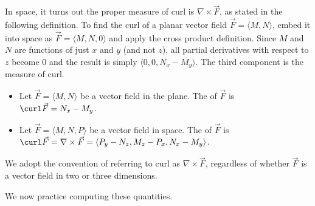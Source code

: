 In space, it turns out the proper measure of curl is $\nabla \times \vec F$, as stated in the following definition. To find the curl of a planar vector field $\vec F = \langle M,N\rangle$, embed it into space as $\vec F = \langle M, N, 0\rangle$ and apply the cross product definition. Since $M$ and $N$ are functions of just $x$ and $y$ (and not $z$), all partial derivatives with respect to $z$ become 0 and the result is simply $\langle 0,0,N_x-M_y\rangle$. The third component is the measure of curl. 

{\begin{itemize}
	\item Let $\vec F = \langle M,N\rangle$ be a vector field in the plane. The  of $\vec F$ is $\curl \vec F = N_x - M_y$.
	\item Let $\vec F = \langle M,N,P\rangle$ be a vector field in space. The  of $\vec F$ is $\curl \vec F = \nabla \times \vec F = \langle P_y-N_z,M_z-P_x,N_x - M_y\rangle$.
\end{itemize}
}

We adopt the convention of referring to curl as $\nabla \times \vec F$, regardless of whether $\vec F$ is a vector field in two or three dimensions. 

We now practice computing these quantities.\\

